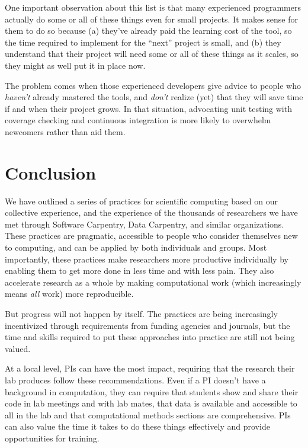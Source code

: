\documentclass[10pt,letterpaper]{article}
\begin{document}
One important observation about this list is that many experienced
programmers actually do some or all of these things even for small
projects. It makes sense for them to do so because (a) they've already
paid the learning cost of the tool, so the time required to implement
for the ``next'' project is small, and (b) they understand that their
project will need some or all of these things as it scales, so they
might as well put it in place now.

The problem comes when those experienced developers give advice to
people who \emph{haven't} already mastered the tools, and \emph{don't}
realize (yet) that they will save time if and when their project
grows.  In that situation, advocating unit testing with coverage
checking and continuous integration is more likely to overwhelm
newcomers rather than aid them.

\section*{Conclusion}

We have outlined a series of practices for scientific computing based
on our collective experience, and the experience of the thousands of
researchers we have met through Software Carpentry, Data Carpentry,
and similar organizations.  These practices are pragmatic, accessible
to people who consider themselves new to computing, and can be applied
by both individuals and groups.  Most importantly, these practices
make researchers more productive individually by enabling them to get
more done in less time and with less pain.  They also accelerate
research as a whole by making computational work (which increasingly
means \emph{all} work) more reproducible.

But progress will not happen by itself. The practices are being 
increasingly incentivized through requirements from funding
agencies and journals, but the time and skills required to put these
approaches into practice are still not being valued. 

At a local level, PIs can have the most impact, requiring that the
research their lab produces follow these recommendations. Even if a PI
doesn't have a background in computation, they can require that
students show and share their code in lab meetings and with lab mates,
that data is available and accessible to all in the lab and that
computational methods sections are comprehensive. PIs can also value
the time it takes to do these things effectively and provide
opportunities for training.
\end{document}
